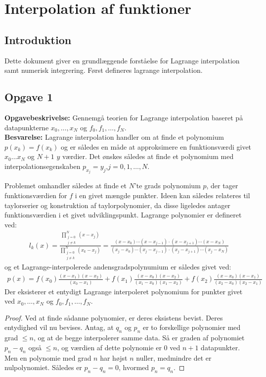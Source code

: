 \chapter{Interpolation af funktioner}
% 
\section*{Introduktion}
Dette dokument giver en grundlæggende forståelse for Lagrange interpolation samt numerisk integrering. 
%
Først defineres lagrange interpolation.
\section*{Opgave 1}
\textbf{Opgavebeskrivelse:} Gennemgå teorien for Lagrange interpolation baseret på datapunkterne $x_0, \ldots, x_N$ og $f_0, f_1, \ldots , f_N$. \\
\textbf{Besvarelse:} 
Lagrange interpolation handler om at finde et polynomium $p(x_k)=f(x_k)$ og er således en måde at approksimere en funktionsværdi givet $x_0 \ldots x_N$ og $N+1 $  $y$ værdier.
Det ønskes således at finde et polynomium med interpolationsegenskaben $p_{x_j}=y_j$,$j=0,1,\ldots,N$.

Problemet omhandler således at finde et $N$'te grads polynomium $p$, der tager funktionsværdien for $f$ i en givet mængde punkter. 
Ideen kan således relateres til taylorserier og konstruktion af taylorpolynomier, da disse ligeledes antager funktionsværdien i et givet udviklingspunkt.
Lagrange polynomier er defineret ved:
\begin{align*}
l_k(x)=\frac{\prod_{\substack{j=0 \\ {j \neq k}}}^{N}(x-x_j)}{\prod_{\substack{j=0 \\ {j \neq k}}}^{N}(x_k-x_j)}=\frac{(x-x_0) \cdots (x-x_{j-1}) \cdot (x-x_{j+1})\cdots(x-x_N)}{(x_j-x_0)\cdots (x_j-x_{j-1}) \cdot (x_j-x_{j+1})\cdots (x_j - x_N)}
\end{align*}
og et Lagrange-interpolerede andensgradspolynumium er således givet ved:
\begin{align*}
p(x)=f(x_0)\frac{(x-x_1)(x-x_2)}{(x_0-x_1)}+f(x_1)\frac{(x-x_0)(x-x_2)}{(x_1-x_0)(x_1-x_2)}+f(x_2)\frac{(x-x_0)(x-x_1)}{(x_2-x_0)(x_2-x_1)}
\end{align*}
Der eksisterer et entydigt Lagrange interpoleret polynomium for punkter givet ved $x_0, \ldots, x_N$ og $f_0, f_1, \ldots , f_N$.
\begin{proof}
Ved at finde sådanne polynomier, er deres eksistens bevist. Deres entydighed vil nu bevises. 
Antag, at $q_n$ og $p_n$ er to forskellige polynomier med grad $\leq n$, og at de begge interpolerer samme data. 
Så er graden af polynomiet $p_n - q_n$ også $\leq n$, og værdien af dette polynomie er $0$ ved $n+1$ datapunkter. 
Men en polynomie med grad $n$ har højst $n$ nuller, medmindre det er nulpolynomiet. 
Således er $p_n - q_n = 0$, hvormed $p_n = q_n$. 
\end{proof}
